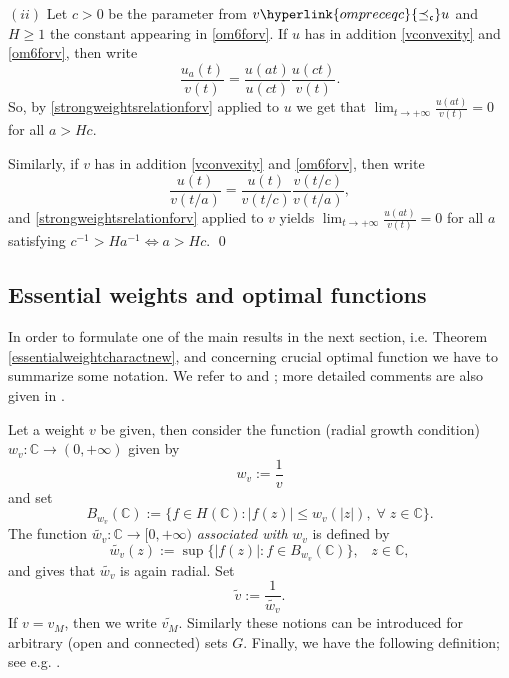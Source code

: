 \documentclass[10pt]{amsart}%
\numberwithin{equation}{section}
\theoremstyle{plain}
\newcommand{\CC}{\mathbb{C}}
\begin{document}
$(ii)$ Let $c>0$ be the parameter from $v\hyperlink{ompreceqc}{\preceq_{\mathfrak{c}}}u$ and $H\ge 1$ the constant appearing in \eqref{om6forv}. If $u$ has in addition \eqref{vconvexity} and \eqref{om6forv}, then write $$\frac{u_a(t)}{v(t)}=\frac{u(at)}{u(ct)}\frac{u(ct)}{v(t)}.$$
So, by \eqref{strongweightsrelationforv} applied to $u$ we get that $\lim_{t\rightarrow+\infty}\frac{u(at)}{v(t)}=0$ for all $a>Hc$.

Similarly, if $v$ has in addition \eqref{vconvexity} and \eqref{om6forv}, then write
$$\frac{u(t)}{v(t/a)}=\frac{u(t)}{v(t/c)}\frac{v(t/c)}{v(t/a)},$$
and \eqref{strongweightsrelationforv} applied to $v$ yields $\lim_{t\rightarrow+\infty}\frac{u(at)}{v(t)}=0$ for all $a$ satisfying $c^{-1}>Ha^{-1}\Leftrightarrow a>Hc$.
\qed\enddemo

\subsection{Essential weights and optimal functions}\label{essentialsection}
In order to formulate one of the main results in the next section, i.e. Theorem \ref{essentialweightcharactnew}, and concerning crucial optimal function we have to summarize some notation. We refer to \cite[Def. 1.1, Sect. 1.B]{BierstedtBonetTaskinen98} and \cite[Sect. 3]{Bonet2022survey}; more detailed comments are also given in \cite[Sect. 3.1]{weightedentirecharacterization}.

Let a weight $v$ be given, then consider the function (radial growth condition) $w_v: \CC\rightarrow(0,+\infty)$ given by
\begin{equation}\label{corrgrowthcond}
w_v:=\frac{1}{v}
\end{equation}
and set
$$B_{w_v}(\CC):=\{f\in H(\CC): |f(z)|\le w_v(|z|),\;\forall\;z\in\CC\}.$$
The function $\widetilde{w_v}:\CC\rightarrow[0,+\infty)$ {\itshape associated with} $w_v$ is defined by
\begin{equation}\label{assoweightw}
\widetilde{w_v}(z):=\sup\{|f(z)|: f\in B_{w_v}(\CC)\},\;\;\;z\in\CC,
\end{equation}
and \cite[Observ. 1.5]{BierstedtBonetTaskinen98} gives that $\widetilde{w_v}$ is again radial. Set
\begin{equation}\label{assoweightv}
\widetilde{v}:=\frac{1}{\widetilde{w_v}}.
\end{equation}
If $v=v_M$, then we write $\widetilde{v_M}$. Similarly these notions can be introduced for arbitrary (open and connected) sets $G$. Finally, we have the following definition; see e.g. \cite[Sect. 3]{Bonet2022survey}.
\end{document}
